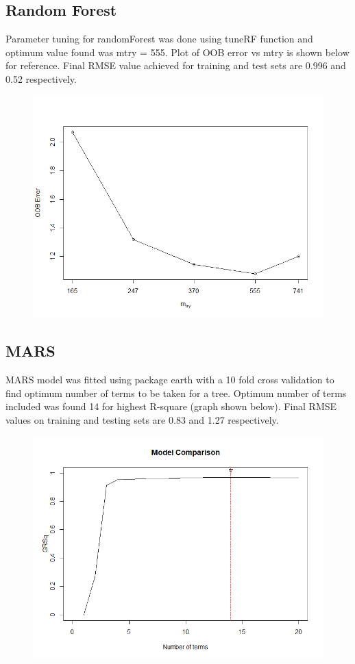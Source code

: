 \documentclass[letterpaper,12pt]{article}
\begin{document}
\subsection{Random Forest}
Parameter tuning for randomForest was done using tuneRF function and optimum value found was mtry = 555. Plot of OOB error vs mtry is shown below for reference. Final RMSE value achieved for training and test sets are 0.996 and 0.52 respectively.
\begin{figure}[H] 
        \centering \includegraphics[width=0.7\columnwidth]{mtryselection.png}
\end{figure}

\subsection{MARS}
MARS model was fitted using package earth with a 10 fold cross validation to find optimum number of terms to be taken for a tree. Optimum number of terms included was found 14 for highest R-square (graph shown below). Final RMSE values on training and testing sets are 0.83 and 1.27 respectively.
\begin{figure}[H] 
        \centering \includegraphics[width=0.7\columnwidth]{Mars.png}
\end{figure}
\end{document}
